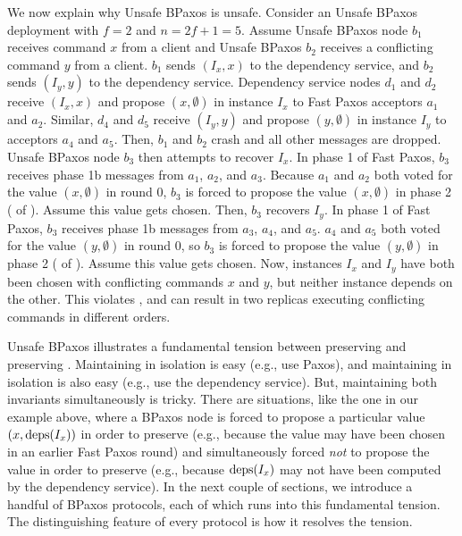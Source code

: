We now explain why Unsafe BPaxos is unsafe. Consider an Unsafe BPaxos
deployment with $f = 2$ and $n = 2f + 1 = 5$.
%
Assume Unsafe BPaxos node $b_1$ receives command $x$ from a client and
Unsafe BPaxos $b_2$ receives a conflicting command $y$ from a client. $b_1$
sends $(I_x, x)$ to the dependency service, and $b_2$ sends $(I_y, y)$ to the
dependency service. Dependency service nodes $d_1$ and $d_2$ receive $(I_x, x)$
and propose $(x, \emptyset)$ in instance $I_x$ to Fast Paxos acceptors $a_1$
and $a_2$. Similar, $d_4$ and $d_5$ receive $(I_y, y)$ and propose $(y,
\emptyset)$ in instance $I_y$ to acceptors $a_4$ and $a_5$. Then, $b_1$ and
$b_2$ crash and all other messages are dropped. Unsafe BPaxos node $b_3$
then attempts to recover $I_x$. In phase 1 of Fast Paxos, $b_3$ receives phase
1b messages from $a_1$, $a_2$, and $a_3$. Because $a_1$ and $a_2$ both voted
for the value $(x, \emptyset{})$ in round $0$, $b_3$ is forced to propose the
value $(x, \emptyset)$ in phase 2 ( of
). Assume this value gets chosen. Then, $b_3$ recovers
$I_y$. In phase 1 of Fast Paxos, $b_3$ receives phase 1b messages from $a_3$,
$a_4$, and $a_5$. $a_4$ and $a_5$ both voted for the value $(y, \emptyset{})$
in round $0$, so $b_3$ is forced to propose the value $(y, \emptyset)$ in phase
2 ( of ). Assume this value gets
chosen. Now, instances $I_x$ and $I_y$ have both been chosen with conflicting
commands $x$ and $y$, but neither instance depends on the other. This violates
, and can result in two replicas executing
conflicting commands in different orders.

Unsafe BPaxos illustrates a fundamental tension between preserving
 and preserving .
Maintaining  in isolation is easy (e.g., use Paxos),
and maintaining  in isolation is also easy (e.g., use
the dependency service). But, maintaining both invariants simultaneously is
tricky. There are situations, like the one in our example above, where a BPaxos
node is forced to propose a particular value $(x, \text{deps}(I_x))$ in order to
preserve  (e.g., because the value may have been
chosen in an earlier Fast Paxos round) and simultaneously forced \emph{not} to
propose the value in order to preserve  (e.g.,
because $\text{deps}(I_x)$ may not have been computed by the dependency service).
%
In the next couple of sections, we introduce a handful of BPaxos protocols,
each of which runs into this fundamental tension. The distinguishing feature of
every protocol is how it resolves the tension.
